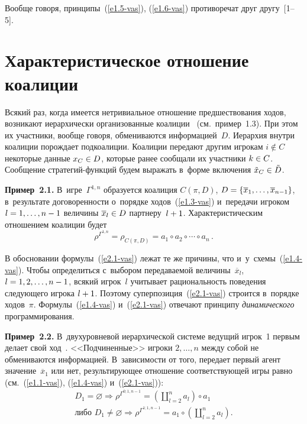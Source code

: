 \begin{multicols}{2}
        \vspace*{-6pt}
        
        \noindent
Вообще говоря, принципы~(\ref{e1.5-vas}), (\ref{e1.6-vas}) противоречат друг 
другу~[1--5].

\vspace*{-4pt}

\section{Характеристическое отношение коалиции}

\vspace*{-4pt}
 
    Всякий раз, когда имеется нетривиальное отношение пред\-шест\-во\-ва\-ния ходов, 
возникают иерархически организованные коалиции~\cite{1-vas, 2-vas, 5-vas} (см.\ 
пример~1.3). При этом их участники, вообще говоря, обмениваются 
информацией~$D$. Иерархия внут\-ри коалиции по\-рож\-да\-ет подкоалиции. Коалиции 
передают другим игрокам $i\notin C$ некоторые данные $x_C\hm\in D$, которые 
ранее сообщали их участники $k\hm\in C$. Сообщение стра\-те\-гий-функ\-ций 
будем выражать в~форме включения $\tilde{x}_C\hm\in \tilde{D}$. 
    
    \textbf{Пример~2.1.} В~игре~$\Gamma^{1,n}$ образуется коалиция $C(\pi, 
D)$, $D\hm= \{\overline{x}_1, \ldots , \overline{x}_{n-1}\}$, в~результате 
до\-го\-во\-рен\-ности о~порядке ходов~(\ref{e1.3-vas}) и~передачи игроком $l\hm= 1, 
\ldots , n\hm-1$ величины $\overline{x}_l\hm\in D$ партнеру~$l\hm+1$. 
Характеристическим отношением коалиции будет 
     \begin{equation}
     \rho^{\Gamma^{1,n}}=\rho_{C(\pi,D)} =a_1\circ a_2\circ \cdots\circ a_n\,.
     \label{e2.1-vas}
     \end{equation}
    
    В обосновании формулы~(\ref{e2.1-vas}) лежат те же причины, что 
и~у~схемы~(\ref{e1.4-vas}). Чтобы определиться с~выбором пе\-ре\-да\-ва\-емой 
величины~$\overline{x}_l$, $l\hm= 1,2, \ldots ,n\hm-1$, всякий игрок~$l$ учитывает 
ра\-ци\-о\-наль\-ность поведения сле\-ду\-юще\-го игрока $l\hm+1$. Поэтому 
суперпозиция~(\ref{e2.1-vas}) строится в~порядке ходов~$\pi$. 
 Формулы~(\ref{e1.4-vas}) и~(\ref{e2.1-vas}) отвечают принципу \textit{динамического} 
программирования. 
    
    \textbf{Пример~2.2.} В~двухуровневой иерархической сис\-те\-ме ведущий 
игрок~1 пер\-вым делает свой ход~\cite{2-vas}. <<Подчиненные>> игроки $2, \ldots , 
n$ между собой не обмениваются информацией. В~за\-ви\-си\-мости от того, передает 
пер\-вый агент значение~$\overline{x}_1$ или нет, ре\-зуль\-ти\-ру\-ющее отношение 
со\-от\-вет\-ст\-ву\-ющей игры рав\-но (см.~(\ref{e1.1-vas}), (\ref{e1.4-vas}) и~(\ref{e2.1-vas})):
    \begin{multline}
    D_1=\varnothing\Rightarrow \rho^{\Gamma^{0;1,n-1}} =  \left( 
\coprod\limits_{l=2}^n a_l\right) \circ a_1 \\
  \mbox{либо\ }  D_1\not= \varnothing\Rightarrow \rho^{\Gamma^{1;1,n-1}} =a_1\circ \left( 
\coprod\limits^n_{l=2} a_l\right) .
\label{e2.2-vas}
    \end{multline}
    

\end{multicols}
